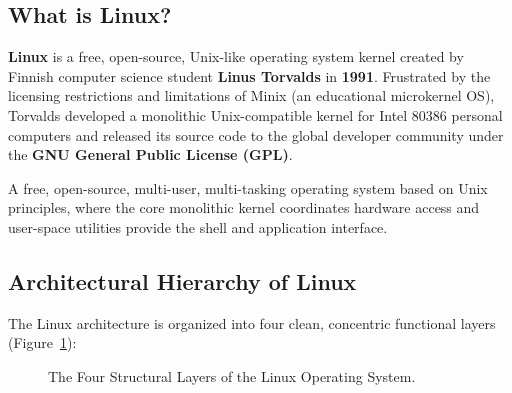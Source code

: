 \subsection{What is Linux?}

\textbf{Linux} is a free, open-source, Unix-like operating system kernel created by Finnish computer science student \textbf{Linus Torvalds} in \textbf{1991}. Frustrated by the licensing restrictions and limitations of Minix (an educational microkernel OS), Torvalds developed a monolithic Unix-compatible kernel for Intel 80386 personal computers and released its source code to the global developer community under the \textbf{GNU General Public License (GPL)}.

\begin{definition}
A free, open-source, multi-user, multi-tasking operating system based on Unix principles, where the core monolithic kernel coordinates hardware access and user-space utilities provide the shell and application interface.
\end{definition}

\subsection{Architectural Hierarchy of Linux}

The Linux architecture is organized into four clean, concentric functional layers (Figure~\ref{fig:linux-architecture-layers}):

\begin{figure}[htbp]
\centering
{}
\caption{The Four Structural Layers of the Linux Operating System.}
\label{fig:linux-architecture-layers}
\end{figure}

